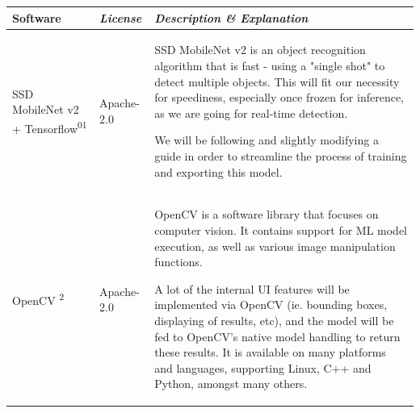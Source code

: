 \documentclass[conference]{IEEEtran}
\begin{document}
\begin{table}[htbp!]\normalsize
\begin{center}
\begin{tabular}{|p{1.5cm}|p{1.5cm}|p{4.7cm}|}
\hline
\textbf{Software} & \textbf{\textit{License}}& \textbf{\textit{Description \& Explanation}}\\
\hline
SSD MobileNet v2 + Tensorflow\textsuperscript{0}\textsuperscript{1} & Apache-2.0 &
SSD MobileNet v2 is an object recognition algorithm that is fast - using a "single shot" to detect multiple objects. This will fit our necessity for speediness, especially once frozen for inference, as we are going for real-time detection. 

We will be following and slightly modifying a guide in order to streamline the process of training and exporting this model.
\\ \hline
OpenCV \textsuperscript{2} & Apache-2.0 &
OpenCV is a software library that focuses on computer vision. It contains support for ML model execution, as well as various image manipulation functions.\newline

A lot of the internal UI features will be implemented via OpenCV (ie. bounding boxes, displaying of results, etc), and the model will be fed to OpenCV's native model handling to return these results. It is available on many platforms and languages, supporting Linux, C++ and Python, amongst many others.
\\ \hline
\end{tabular}
\label{tab1}
\end{center}
\end{table}
\end{document}
